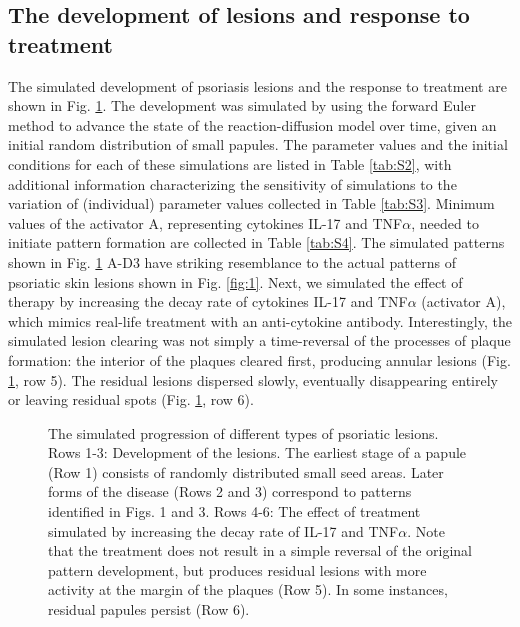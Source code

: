\subsection{The development of lesions and response to treatment}
The simulated development of psoriasis lesions and the response to treatment are shown in Fig. \ref{fig:4}. The development was simulated by using the forward Euler method to advance the state of the reaction-diffusion model over time, given an initial random distribution of small papules. The parameter values and the initial conditions for each of these simulations are listed in Table \ref{tab:S2}, with additional information characterizing the sensitivity of simulations to the variation of (individual) parameter values collected in Table \ref{tab:S3}. Minimum values of the activator A, representing cytokines IL-17 and TNF$\alpha$, needed to initiate pattern formation are collected in Table \ref{tab:S4}. The simulated patterns shown in Fig. \ref{fig:4} A-D3 have striking resemblance to the actual patterns of psoriatic skin lesions shown in Fig. \ref{fig:1}. Next, we simulated the effect of therapy by increasing the decay rate of cytokines IL-17 and TNF$\alpha$ (activator A), which mimics real-life treatment with an anti-cytokine antibody. Interestingly, the simulated lesion clearing was not simply a time-reversal of the processes of plaque formation: the interior of the plaques cleared first, producing annular lesions (Fig. \ref{fig:4}, row 5). The residual lesions dispersed slowly, eventually disappearing entirely or leaving residual spots (Fig. \ref{fig:4}, row 6). %

\begin{figure}[ht]
	\centering
	\caption[The simulated progression of different types of psoriatic lesions]{The simulated progression of different types of psoriatic lesions. Rows 1-3: Development of the lesions. The earliest stage of a papule (Row 1) consists of randomly distributed small seed areas. Later forms of the disease (Rows 2 and 3) correspond to patterns identified in Figs. 1 and 3. Rows 4-6: The effect of treatment simulated by increasing the decay rate of IL-17 and TNF$\alpha$. Note that the treatment does not result in a simple reversal of the original pattern development, but produces residual lesions with more activity at the margin of the plaques (Row 5). In some instances, residual papules persist (Row 6).}
	\label{fig:4}
\end{figure}

